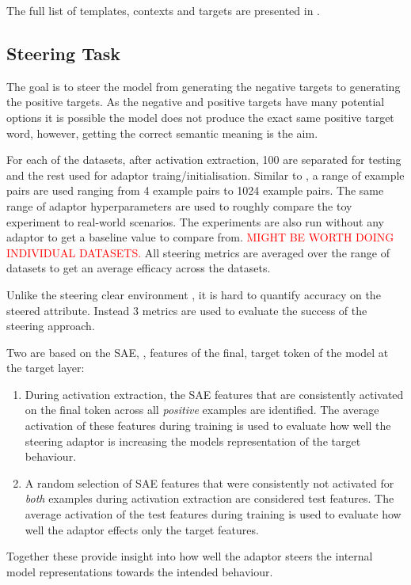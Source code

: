 The full list of templates, contexts and targets are presented in .

\subsection{Steering Task}

The goal is to steer the model from generating the negative targets to generating the positive targets.
As the negative and positive targets have many potential options it is possible the model does not produce the exact same positive target word, however, getting the correct semantic meaning is the aim.

For each of the datasets, after activation extraction, 100 are separated for testing and the rest used for adaptor traing/initialisation.
Similar to \cite{steering-clear}, a range of example pairs are used ranging from 4 example pairs to 1024 example pairs.
The same range of adaptor hyperparameters are used to roughly compare the toy experiment to real-world scenarios.
The experiments are also run without any adaptor to get a baseline value to compare from.
\textcolor{red}{MIGHT BE WORTH DOING INDIVIDUAL DATASETS.}
All steering metrics are averaged over the range of datasets to get an average efficacy across the datasets.

 Unlike the steering clear environment , it is hard to quantify accuracy on the steered attribute.
Instead 3 metrics are used to evaluate the success of the steering approach.

Two are based on the SAE, , features of the final, target token of the model at the target layer:
\begin{enumerate}[nolistsep]
    \item During activation extraction, the SAE features that are consistently activated on the final token across all \emph{positive} examples are identified.
        The average activation of these features during training is used to evaluate how well the steering adaptor is increasing the models representation of the target behaviour.
    \item A random selection of SAE features that were consistently not activated for \emph{both} examples during activation extraction are considered test features.
        The average activation of the test features during training is used to evaluate how well the adaptor effects only the target features.
\end{enumerate}
Together these provide insight into how well the adaptor steers the internal model representations towards the intended behaviour.

